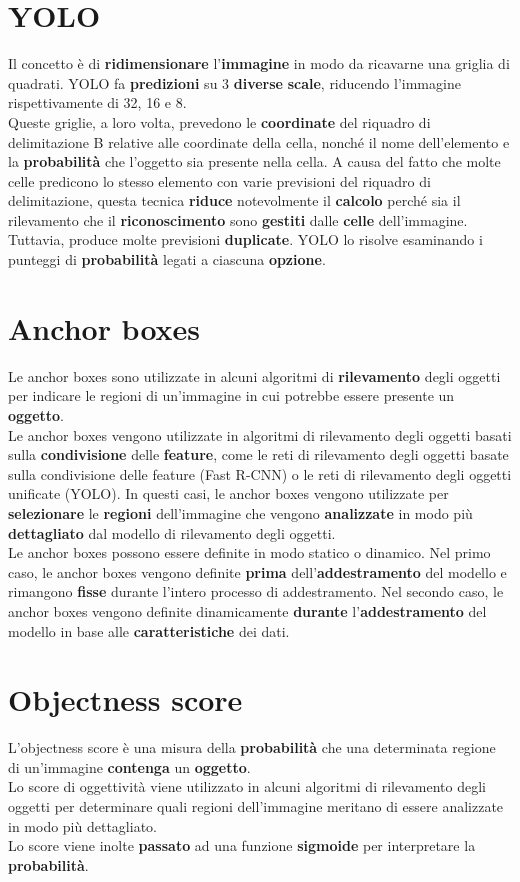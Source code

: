 \documentclass{article}
\begin{document}
\section{YOLO}
Il concetto è di \textbf{ridimensionare} l’\textbf{immagine} in modo da ricavarne una griglia di quadrati. YOLO fa \textbf{predizioni} su 3 \textbf{diverse} \textbf{scale}, riducendo l’immagine rispettivamente di 32, 16 e 8.\\
Queste griglie, a loro volta, prevedono le \textbf{coordinate} del riquadro di delimitazione B relative alle coordinate della cella, nonché il nome dell'elemento e la \textbf{probabilità} che l'oggetto sia presente nella cella. A causa del fatto che molte celle predicono lo stesso elemento con varie previsioni del riquadro di delimitazione, questa tecnica \textbf{riduce} notevolmente il \textbf{calcolo} perché sia il rilevamento che il \textbf{riconoscimento} sono \textbf{gestiti} dalle \textbf{celle} dell'immagine. Tuttavia, produce molte previsioni \textbf{duplicate}. YOLO lo risolve esaminando i punteggi di \textbf{probabilità} legati a ciascuna \textbf{opzione}.


\section{Anchor boxes}
Le anchor boxes sono utilizzate in alcuni algoritmi di \textbf{rilevamento} degli oggetti per indicare le regioni di un'immagine in cui potrebbe essere presente un \textbf{oggetto}.
\\
Le anchor boxes vengono utilizzate in algoritmi di rilevamento degli oggetti basati sulla \textbf{condivisione} delle \textbf{feature}, come le reti di rilevamento degli oggetti basate sulla condivisione delle feature (Fast R-CNN) o le reti di rilevamento degli oggetti unificate (YOLO). In questi casi, le anchor boxes vengono utilizzate per \textbf{selezionare} le \textbf{regioni} dell'immagine che vengono \textbf{analizzate} in modo più \textbf{dettagliato} dal modello di rilevamento degli oggetti.
\\
Le anchor boxes possono essere definite in modo statico o dinamico. Nel primo caso, le anchor boxes vengono definite \textbf{prima} dell'\textbf{addestramento} del modello e rimangono \textbf{fisse} durante l'intero processo di addestramento. Nel secondo caso, le anchor boxes vengono definite dinamicamente \textbf{durante} l'\textbf{addestramento} del modello in base alle \textbf{caratteristiche} dei dati.

\section{Objectness score}
L'objectness score è una misura della \textbf{probabilità} che una determinata regione di un'immagine \textbf{contenga} un \textbf{oggetto}.\\
Lo score di oggettività viene utilizzato in alcuni algoritmi di rilevamento degli oggetti per determinare quali regioni dell'immagine meritano di essere analizzate in modo più dettagliato. \\
Lo score viene inolte \textbf{passato} ad una funzione \textbf{sigmoide} per interpretare la \textbf{probabilità}.
\end{document}

